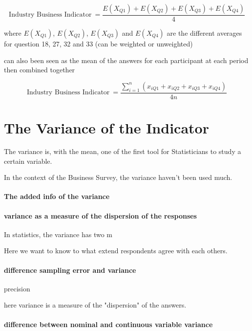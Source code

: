 \documentclass[12pt,a4paper,oneside]{book}
\begin{document}
\begin{equation}
    \mbox{Industry Business Indicator}\ = \frac{E(X_{Q1}) + E(X_{Q2}) + E(X_{Q3}) + E(X_{Q4})}{4}
\end{equation}

where 
$E(X_{Q1})$, $E(X_{Q2})$, $E(X_{Q3})$ and $E(X_{Q4})$ are the different averages for question 18, 27, 32 and 33 (can be weighted or unweighted)

can also been seen as the mean of the answers for each participant at each period then combined together

\begin{equation}
    \mbox{Industry Business Indicator}\ = \frac{\sum_{i=1}^n \left(x_{i Q1} + x_{i Q2} + x_{i Q3} + x_{i Q4} \right)}{4n}
\end{equation}


\chapter{The Variance of the Indicator}

The variance is, with the mean, one of the first tool for Statisticians to study a certain variable.

In the context of the Business Survey, the variance haven't been used much.

\subsubsection{The added info of the variance}



\subsubsection{variance as a measure of the dispersion of the responses}

In statistics, the variance has two m

Here we want to know to what extend respondents agree with each others.




\subsubsection{difference sampling error and variance}

precision

here variance is a measure of the "dispersion" of the answers.

\subsubsection{difference between nominal and continuous variable variance}
\end{document}
